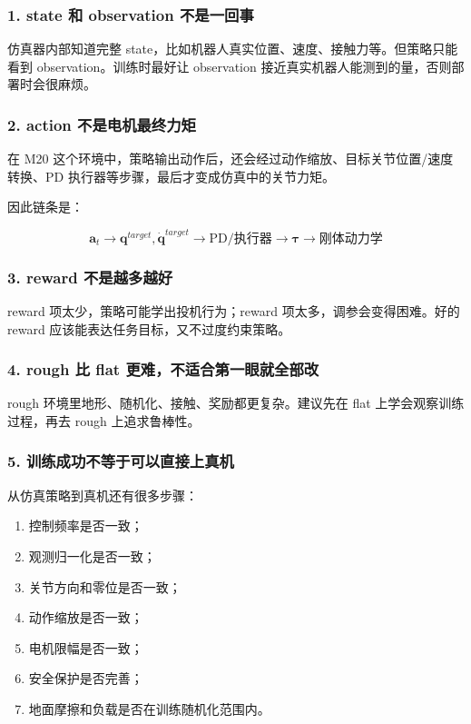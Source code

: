 \documentclass[UTF8,11pt,a4paper]{ctexart}
\newcommand{\bs}[1]{\bm{#1}}
\begin{document}
\subsubsection{1. state 和 observation 不是一回事}

仿真器内部知道完整 state，比如机器人真实位置、速度、接触力等。但策略只能看到 observation。训练时最好让 observation 接近真实机器人能测到的量，否则部署时会很麻烦。

\subsubsection{2. action 不是电机最终力矩}

在 M20 这个环境中，策略输出动作后，还会经过动作缩放、目标关节位置/速度转换、PD 执行器等步骤，最后才变成仿真中的关节力矩。

因此链条是：

\[
\boxed{
\bs a_t
\rightarrow
\bs q^{target},\dot{\bs q}^{target}
\rightarrow
\text{PD/执行器}
\rightarrow
\bs \tau
\rightarrow
\text{刚体动力学}
}
\]

\subsubsection{3. reward 不是越多越好}

reward 项太少，策略可能学出投机行为；reward 项太多，调参会变得困难。好的 reward 应该能表达任务目标，又不过度约束策略。

\subsubsection{4. rough 比 flat 更难，不适合第一眼就全部改}

rough 环境里地形、随机化、接触、奖励都更复杂。建议先在 flat 上学会观察训练过程，再去 rough 上追求鲁棒性。

\subsubsection{5. 训练成功不等于可以直接上真机}

从仿真策略到真机还有很多步骤：

\begin{enumerate}
  \item 控制频率是否一致；
  \item 观测归一化是否一致；
  \item 关节方向和零位是否一致；
  \item 动作缩放是否一致；
  \item 电机限幅是否一致；
  \item 安全保护是否完善；
  \item 地面摩擦和负载是否在训练随机化范围内。
\end{enumerate}
\end{document}
